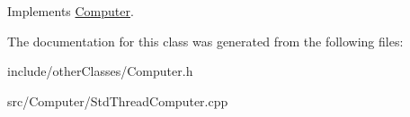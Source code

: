 Implements \hyperlink{classComputer_ad2b5a813419e9152c4a1e22d9531b636}{Computer}.



The documentation for this class was generated from the following files\+:\begin{DoxyCompactItemize}
\item 
include/other\+Classes/Computer.\+h\item 
src/\+Computer/Std\+Thread\+Computer.\+cpp\end{DoxyCompactItemize}
